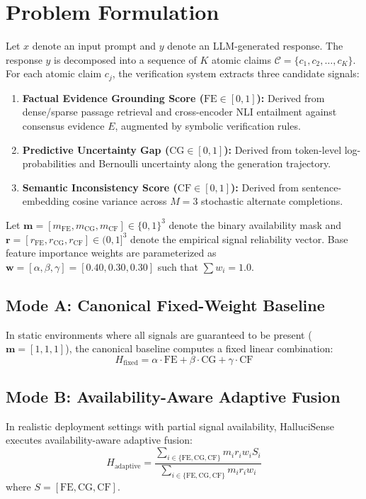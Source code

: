 \documentclass[conference]{IEEEtran}
\begin{document}
\section{Problem Formulation}
\label{sec:problem_formulation}
Let $x$ denote an input prompt and $y$ denote an LLM-generated response. The response $y$ is decomposed into a sequence of $K$ atomic claims $\mathcal{C} = \{c_1, c_2, \dots, c_K\}$. For each atomic claim $c_j$, the verification system extracts three candidate signals:
\begin{enumerate}
    \item \textbf{Factual Evidence Grounding Score ($\text{FE} \in [0, 1]$):} Derived from dense/sparse passage retrieval and cross-encoder NLI entailment against consensus evidence $E$, augmented by symbolic verification rules.
    \item \textbf{Predictive Uncertainty Gap ($\text{CG} \in [0, 1]$):} Derived from token-level log-probabilities and Bernoulli uncertainty along the generation trajectory.
    \item \textbf{Semantic Inconsistency Score ($\text{CF} \in [0, 1]$):} Derived from sentence-embedding cosine variance across $M=3$ stochastic alternate completions.
\end{enumerate}

Let $\mathbf{m} = [m_{\text{FE}}, m_{\text{CG}}, m_{\text{CF}}] \in \{0, 1\}^3$ denote the binary availability mask and $\mathbf{r} = [r_{\text{FE}}, r_{\text{CG}}, r_{\text{CF}}] \in (0, 1]^3$ denote the empirical signal reliability vector. Base feature importance weights are parameterized as $\mathbf{w} = [\alpha, \beta, \gamma] = [0.40, 0.30, 0.30]$ such that $\sum w_i = 1.0$.

\subsection{Mode A: Canonical Fixed-Weight Baseline}
In static environments where all signals are guaranteed to be present ($\mathbf{m} = [1, 1, 1]$), the canonical baseline computes a fixed linear combination:
\begin{equation}
H_{\text{fixed}} = \alpha \cdot \text{FE} + \beta \cdot \text{CG} + \gamma \cdot \text{CF}
\label{eq:fixed_fusion}
\end{equation}

\subsection{Mode B: Availability-Aware Adaptive Fusion}
In realistic deployment settings with partial signal availability, HalluciSense executes availability-aware adaptive fusion:
\begin{equation}
H_{\text{adaptive}} = \frac{\sum_{i \in \{\text{FE}, \text{CG}, \text{CF}\}} m_i r_i w_i S_i}{\sum_{i \in \{\text{FE}, \text{CG}, \text{CF}\}} m_i r_i w_i}
\label{eq:adaptive_fusion}
\end{equation}
where $S = [\text{FE}, \text{CG}, \text{CF}]$.
\end{document}
